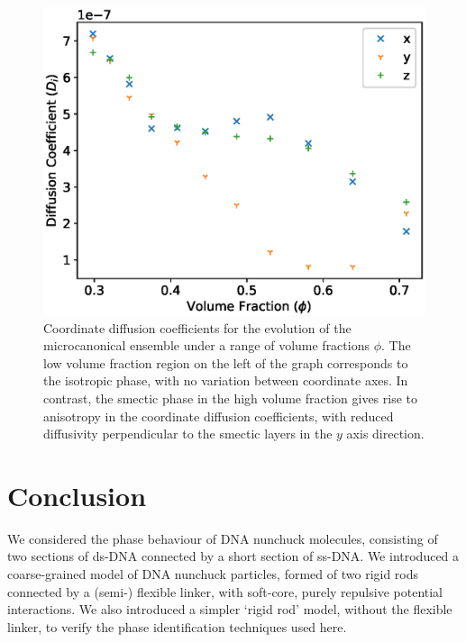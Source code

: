 \documentclass[11pt, a4paper]{article} %
\begin{document}
\begin{figure} [h!]
	\centering
	\includegraphics[width=0.7\linewidth]{Figures/nun_diff_Dcoeff}
	\caption{Coordinate diffusion coefficients for the evolution of the microcanonical ensemble under a range of volume fractions $\phi$. The low volume fraction region on the left of the graph corresponds to the isotropic phase, with no variation between coordinate axes. In contrast, the smectic phase in the high volume fraction gives rise to anisotropy in the coordinate diffusion coefficients, with reduced diffusivity perpendicular to the smectic layers in the $y$ axis direction.}
	\label{fig:nun_diff_Dcoeff}
\end{figure}  %


\section{Conclusion}

We considered the phase behaviour of DNA nunchuck molecules, consisting of two sections of ds-DNA connected by a short section of ss-DNA. We introduced a coarse-grained model of DNA nunchuck particles, formed of two rigid rods connected by a (semi-) flexible linker, with soft-core, purely repulsive potential interactions. We also introduced a simpler `rigid rod' model, without the flexible linker, to verify the phase identification techniques used here.
\end{document}
